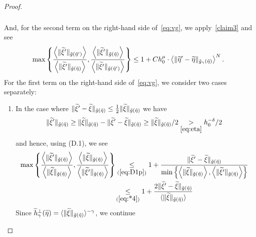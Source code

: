 \documentclass[AHL,Unicode,longabstracts,published]{cedram}
\newcommand*\ineq[1]{\underset{(#1)}{\leq}}
\let\oldtilde\tilde
\renewcommand*{\tilde}[1]{\mathchoice{\widetilde{#1}}{\widetilde{#1}}{\oldtilde{#1}}{\oldtilde{#1}}}
\begin{document}
\begin{proof}
\begin{multline}
\begin{aligned}
\end{aligned}
\end{multline}
And, for the second term on the right-hand side of~\eqref{eq:vg}, we apply~\eqref{claim3} and see
\begin{equation}\label{hgamma1}
\max\left\{ \frac{\left\langle\|\tilde{\xi}'\|_{\tilde{g}\left(\tilde{\eta}'\right)}\right\rangle}{\left\langle\|\tilde{\xi}'\|_{\tilde{g}\left(\tilde{\eta}\right)}\right\rangle},\frac{\left\langle\|\tilde{\xi}'\|_{\tilde{g}\left(\tilde{\eta}\right)}\right\rangle}{\left\langle\|\tilde{\xi}'\|_{\tilde{g}\left(\tilde{\eta}'\right)}\right\rangle}\right\} \le1+Ch_{0}^{\mu}\cdot\left\langle \|\tilde{\eta}'-\tilde{\eta}\|_{\tilde{g}_{\gamma}\left(\tilde{\eta}\right)}\right\rangle ^{N}.
\end{equation}
For the first term on the right-hand side of~\eqref{eq:vg}, we consider two cases separately:
\begin{enumerate}
\item In the case where $\|\tilde{\xi}'-\tilde{\xi}\|_{\tilde{g}(\tilde{\eta})}\leq\frac{1}{2}\|\tilde{\xi}\|_{\tilde{g}(\tilde{\eta})}$ we have
\begin{equation}
\|\tilde{\xi}'\|_{\tilde{g}\left(\tilde{\eta}\right)}\ge\|\tilde{\xi}\|_{\tilde{g}\left(\tilde{\eta}\right)}-\|\tilde{\xi}'-\tilde{\xi}\|_{\tilde{g}\left(\tilde{\eta}\right)}\ge\|\tilde{\xi}\|_{\tilde{g}\left(\tilde{\eta}\right)}/2\underset{\eqref{eq:eta}}{>}h_{0}^{-\delta}/2\label{eq:*4}
\end{equation}
and hence, using (D.1), we see
\begin{align}
\max\left\{ \frac{\left\langle\|\tilde{\xi}'\|_{\tilde{g}\left(\tilde{\eta}\right)}\right\rangle}{\left\langle\|\tilde{\xi}\|_{\tilde{g}\left(\tilde{\eta}\right)}\right\rangle},\frac{\left\langle\|\tilde{\xi}\|_{\tilde{g}\left(\tilde{\eta}\right)}\right\rangle}{\left\langle\|\tilde{\xi}'\|_{\tilde{g}\left(\tilde{\eta}\right)}\right\rangle}\right\} & \ineq{\ref{eq:D1p}}1+\frac{\|\tilde{\xi}'-\tilde{\xi}\|_{\tilde{g}\left(\tilde{\eta}\right)}}{\min\left\{\left\langle\|\tilde{\xi}\|_{\tilde{g}\left(\tilde{\eta}\right)}\right\rangle,\left\langle\|\tilde{\xi}'\|_{\tilde{g}\left(\tilde{\eta}\right)}\right\rangle\right\}}\label{eq:log}
\\
& \!\ineq{\ref{eq:*4}}1+\frac{2\|\tilde{\xi}'-\tilde{\xi}\|_{\tilde{g}\left(\tilde{\eta}\right)}}{\langle\|\tilde{\xi}\|_{\tilde{g}\left(\tilde{\eta}\right)}\rangle}\label{eq:*10}
\end{align}
Since $\tilde{h}_{\gamma}^{\perp}(\tilde{\eta})=\langle\|\tilde{\xi}\|_{\tilde{g}(\tilde{\eta})}\rangle^{-\gamma}$, we continue

\end{enumerate}
\end{proof}
\end{document}
